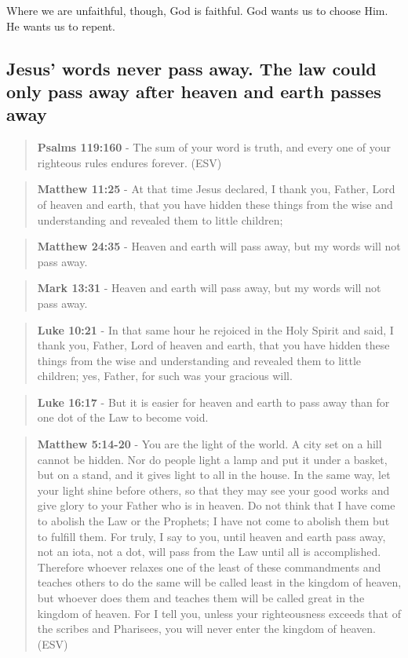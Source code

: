 \documentclass[11pt]{article}
\begin{document}
Where we are unfaithful, though, God is faithful. God wants us to choose Him. He wants us to repent.

\subsection{Jesus' words never pass away. The law could only pass away after heaven and earth passes away}
\label{sec:org69232c9}
\begin{quote}
\textbf{Psalms 119:160} - The sum of your word is truth, and every one of your righteous rules endures forever. (ESV)
\end{quote}

\begin{quote}
\textbf{Matthew 11:25} - At that time Jesus declared, I thank you, Father, Lord of heaven and earth, that you have hidden these things from the wise and understanding and revealed them to little children;
\end{quote}

\begin{quote}
\textbf{Matthew 24:35} - Heaven and earth will pass away, but my words will not pass away.
\end{quote}

\begin{quote}
\textbf{Mark 13:31} - Heaven and earth will pass away, but my words will not pass away.
\end{quote}

\begin{quote}
\textbf{Luke 10:21} - In that same hour he rejoiced in the Holy Spirit and said, I thank you, Father, Lord of heaven and earth, that you have hidden these things from the wise and understanding and revealed them to little children; yes, Father, for such was your gracious will.
\end{quote}

\begin{quote}
\textbf{Luke 16:17} - But it is easier for heaven and earth to pass away than for one dot of the Law to become void.
\end{quote}

\begin{quote}
\textbf{Matthew 5:14-20} - You are the light of the world. A city set on a hill cannot be hidden. Nor do people light a lamp and put it under a basket, but on a stand, and it gives light to all in the house. In the same way, let your light shine before others, so that they may see your good works and give glory to your Father who is in heaven. Do not think that I have come to abolish the Law or the Prophets; I have not come to abolish them but to fulfill them. For truly, I say to you, until heaven and earth pass away, not an iota, not a dot, will pass from the Law until all is accomplished. Therefore whoever relaxes one of the least of these commandments and teaches others to do the same will be called least in the kingdom of heaven, but whoever does them and teaches them will be called great in the kingdom of heaven. For I tell you, unless your righteousness exceeds that of the scribes and Pharisees, you will never enter the kingdom of heaven. (ESV)
\end{quote}
\end{document}
